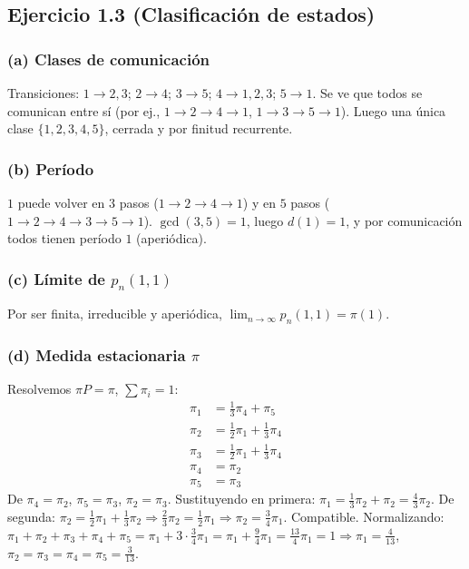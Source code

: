 \documentclass[letterpaper, 12pt]{article}
\newcommand{\1}{\mathbbm{1}}
\begin{document}
    \subsection{Ejercicio 1.3 (Clasificaci\'on de estados)}

    \subsubsection*{(a) Clases de comunicaci\'on}
    Transiciones: $1\to2,3$; $2\to4$; $3\to5$; $4\to1,2,3$; $5\to1$. Se ve que todos se comunican entre s\'i (por ej., $1\to2\to4\to1$, $1\to3\to5\to1$). Luego una \'unica clase $\{1,2,3,4,5\}$, cerrada y por finitud recurrente.

    \subsubsection*{(b) Per\'iodo}
    $1$ puede volver en $3$ pasos ($1\to2\to4\to1$) y en $5$ pasos ($1\to2\to4\to3\to5\to1$). $\gcd(3,5)=1$, luego $d(1)=1$, y por comunicaci\'on todos tienen período $1$ (aperi\'odica).

    \subsubsection*{(c) L\'imite de $p_n(1,1)$}
    Por ser finita, irreducible y aperi\'odica, $\lim_{n\to\infty}p_n(1,1)=\pi(1)$.

    \subsubsection*{(d) Medida estacionaria $\pi$}
    Resolvemos $\pi P=\pi$, $\sum\pi_i=1$:
    \[
    \begin{aligned}
    \pi_1&=\tfrac13\pi_4+\pi_5\\
    \pi_2&=\tfrac12\pi_1+\tfrac13\pi_4\\
    \pi_3&=\tfrac12\pi_1+\tfrac13\pi_4\\
    \pi_4&=\pi_2\\
    \pi_5&=\pi_3
    \end{aligned}
    \]
    De $\pi_4=\pi_2$, $\pi_5=\pi_3$, $\pi_2=\pi_3$. Sustituyendo en primera: $\pi_1=\frac13\pi_2+\pi_2=\frac43\pi_2$. De segunda: $\pi_2=\frac12\pi_1+\frac13\pi_2\Rightarrow \frac23\pi_2=\frac12\pi_1\Rightarrow \pi_2=\frac34\pi_1$. Compatible. Normalizando: $\pi_1+\pi_2+\pi_3+\pi_4+\pi_5=\pi_1+3\cdot\frac34\pi_1=\pi_1+\frac94\pi_1=\frac{13}{4}\pi_1=1\Rightarrow \pi_1=\frac{4}{13}$, $\pi_2=\pi_3=\pi_4=\pi_5=\frac{3}{13}$.
\end{document}
